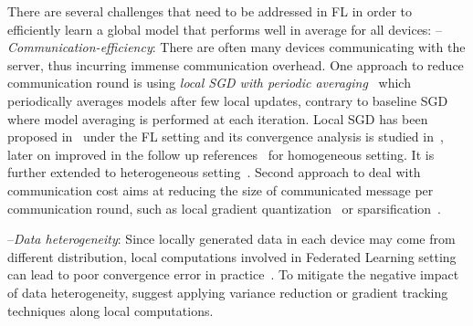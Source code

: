 \documentclass[twoside]{article}
\begin{document}
There are several challenges that need to be addressed in FL in order to efficiently learn a global model that performs well in average for all devices:
-- \emph{Communication-efficiency}: There are often many devices communicating with the server, thus incurring immense communication overhead. 
One approach to reduce communication round is using \emph{local SGD with periodic averaging}~\cite{zhou2018convergence,stich2019local,yu2019parallel,wang2018cooperative} which periodically averages models after few local updates, contrary to baseline SGD~\cite{bottou-bousquet-2008} where model averaging is performed at each iteration.
Local SGD has been proposed in~\cite{mcmahan2016communication,konevcny2016federated} under the FL setting and its convergence analysis is studied in~\cite{stich2019local,wang2018cooperative,zhou2018convergence,yu2019parallel}, later on improved in the follow up references~\cite{haddadpour2019local,haddadpour2019trading,basu2019qsparse,haddadpour2019convergence,bayoumi2020tighter,stich2019error} for homogeneous setting. 
It is further extended to heterogeneous setting~\cite{yu2019linear,li2019convergence,sahu2018convergence,liang2019variance,haddadpour2019convergence,karimireddy2019scaffold}. Second approach to deal with communication cost aims at reducing the size of communicated message per communication round, such as local gradient quantization~\cite{alistarh2017qsgd,bernstein2018signsgd,tang2018communication,wen2017terngrad,wu2018error} or sparsification~\cite{alistarh2018convergence,lin2017deep,stich2018sparsified,stich2019error}. 


--\emph{Data heterogeneity}: 
Since locally generated data in each device may come from different distribution, local computations involved in Federated Learning setting can lead to poor convergence error in practice~\cite{li2019federated,liang2019variance}. 
To mitigate the negative impact of data heterogeneity, \cite{haddadpour2020federated,horvath2019stochastic,liang2019variance,karimireddy2019scaffold} suggest applying variance reduction or gradient tracking techniques along local computations.
\end{document}
